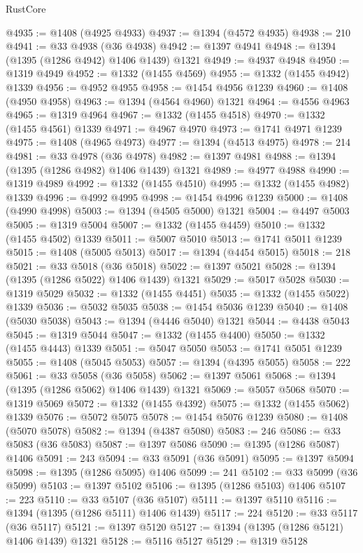 \begin{lexlean}{RustCore}
\begin{coremodule}
@4935 := @1408 (@4925 @4933)
@4937 := @1394 (@4572 @4935)
@4938 := 210
@4941 := @33 @4938 (@36 @4938)
@4942 := @1397 @4941
@4948 := @1394 (@1395 (@1286 @4942) @1406 @1439) @1321
@4949 := @4937 @4948
@4950 := @1319 @4949
@4952 := @1332 (@1455 @4569)
@4955 := @1332 (@1455 @4942) @1339
@4956 := @4952 @4955
@4958 := @1454 @4956 @1239
@4960 := @1408 (@4950 @4958)
@4963 := @1394 (@4564 @4960) @1321
@4964 := @4556 @4963
@4965 := @1319 @4964
@4967 := @1332 (@1455 @4518)
@4970 := @1332 (@1455 @4561) @1339
@4971 := @4967 @4970
@4973 := @1741 @4971 @1239
@4975 := @1408 (@4965 @4973)
@4977 := @1394 (@4513 @4975)
@4978 := 214
@4981 := @33 @4978 (@36 @4978)
@4982 := @1397 @4981
@4988 := @1394 (@1395 (@1286 @4982) @1406 @1439) @1321
@4989 := @4977 @4988
@4990 := @1319 @4989
@4992 := @1332 (@1455 @4510)
@4995 := @1332 (@1455 @4982) @1339
@4996 := @4992 @4995
@4998 := @1454 @4996 @1239
@5000 := @1408 (@4990 @4998)
@5003 := @1394 (@4505 @5000) @1321
@5004 := @4497 @5003
@5005 := @1319 @5004
@5007 := @1332 (@1455 @4459)
@5010 := @1332 (@1455 @4502) @1339
@5011 := @5007 @5010
@5013 := @1741 @5011 @1239
@5015 := @1408 (@5005 @5013)
@5017 := @1394 (@4454 @5015)
@5018 := 218
@5021 := @33 @5018 (@36 @5018)
@5022 := @1397 @5021
@5028 := @1394 (@1395 (@1286 @5022) @1406 @1439) @1321
@5029 := @5017 @5028
@5030 := @1319 @5029
@5032 := @1332 (@1455 @4451)
@5035 := @1332 (@1455 @5022) @1339
@5036 := @5032 @5035
@5038 := @1454 @5036 @1239
@5040 := @1408 (@5030 @5038)
@5043 := @1394 (@4446 @5040) @1321
@5044 := @4438 @5043
@5045 := @1319 @5044
@5047 := @1332 (@1455 @4400)
@5050 := @1332 (@1455 @4443) @1339
@5051 := @5047 @5050
@5053 := @1741 @5051 @1239
@5055 := @1408 (@5045 @5053)
@5057 := @1394 (@4395 @5055)
@5058 := 222
@5061 := @33 @5058 (@36 @5058)
@5062 := @1397 @5061
@5068 := @1394 (@1395 (@1286 @5062) @1406 @1439) @1321
@5069 := @5057 @5068
@5070 := @1319 @5069
@5072 := @1332 (@1455 @4392)
@5075 := @1332 (@1455 @5062) @1339
@5076 := @5072 @5075
@5078 := @1454 @5076 @1239
@5080 := @1408 (@5070 @5078)
@5082 := @1394 (@4387 @5080)
@5083 := 246
@5086 := @33 @5083 (@36 @5083)
@5087 := @1397 @5086
@5090 := @1395 (@1286 @5087) @1406
@5091 := 243
@5094 := @33 @5091 (@36 @5091)
@5095 := @1397 @5094
@5098 := @1395 (@1286 @5095) @1406
@5099 := 241
@5102 := @33 @5099 (@36 @5099)
@5103 := @1397 @5102
@5106 := @1395 (@1286 @5103) @1406
@5107 := 223
@5110 := @33 @5107 (@36 @5107)
@5111 := @1397 @5110
@5116 := @1394 (@1395 (@1286 @5111) @1406 @1439)
@5117 := 224
@5120 := @33 @5117 (@36 @5117)
@5121 := @1397 @5120
@5127 := @1394 (@1395 (@1286 @5121) @1406 @1439) @1321
@5128 := @5116 @5127
@5129 := @1319 @5128

\end{coremodule}
\end{lexlean}
